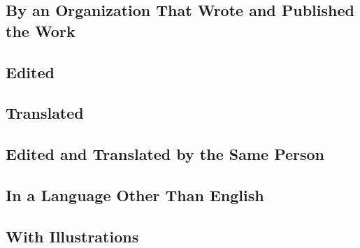 \documentclass{article}
\begin{document}
\subsection{By an Organization That Wrote and Published the Work} %
\label{ssub:by_an_organization_that_wrote_and_published_the_work}
\begin{refsection}
	\nocite{Adirondacks:1990tb}
	\printbibliography[heading=none]
\end{refsection}
\subsection{Edited} %
\label{ssub:edited}
\begin{refsection}
	\nocite{Baron-etal:2007tj,Dunbar:2004tv,Milton:1998ty,Prado:2018vb}
	\printbibliography[heading=none]
\end{refsection}
\subsection{Translated} %
\label{ssub:translated}
\begin{refsection}
	\nocite{Dostoevsky:1993wh,Stendhal:2002ty}
	\printbibliography[heading=none]
\end{refsection}
\subsection{Edited and Translated by the Same Person} %
\label{ssub:edited_and_translated_by_the_same_person}
\begin{refsection}
	\nocite{Freud:2005wb}
	\printbibliography[heading=none]
\end{refsection}
\subsection{In a Language Other Than English} %
\label{ssub:in_a_language_other_than_english}
\begin{refsection}
	\nocite{Chreiteh:2009aa,Fallani:1971vv}
	\printbibliography[heading=none]
\end{refsection}
\subsection{With Illustrations} %
\label{ssub:with_illustrations}
\begin{refsection}
	\nocite{Carroll:2006tm}
	\printbibliography[heading=none]
\end{refsection}
\end{document}

